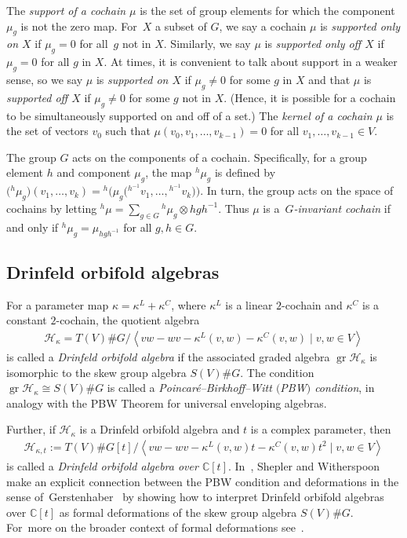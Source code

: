 \documentclass[pdftex]{sigma}
\numberwithin{equation}{section}
\newcommand{\standout}[1]{\textit{#1}} %
\newcommand{\actby}[1]{{}^{#1}}
\DeclareMathOperator{\gr}{gr}
\begin{document}
The \standout{support of a cochain $\mu$} is the set of group elements for which the component $\mu_g$ is not the zero map. For~$X$ a subset of $G$, we say a cochain $\mu$ is \standout{supported only on {\boldmath $X$}} if $\mu_g=0$ for all~$g$ not in $X$. Similarly, we say $\mu$ is
\standout{supported only off {\boldmath $X$}} if $\mu_g=0$ for all $g$ in $X$.
At times, it is convenient to talk about support in a weaker sense, so we say $\mu$ is \standout{supported on {\boldmath $X$}} if $\mu_g\neq0$ for some $g$ in $X$
and that $\mu$ is \standout{supported off {\boldmath $X$}} if $\mu_g\neq0$ for some $g$ not in $X$. (Hence, it is possible for a cochain to be simultaneously supported on and off of a set.)
The \standout{kernel of a cochain $\mu$} is the set of vectors $v_0$ such that $\mu(v_0,v_1,\ldots,v_{k-1})=0$ for all $v_1,\ldots,v_{k-1}\in V$.

The group $G$ acts on the components of a cochain. Specifically, for a group element $h$ and component $\mu_g$, the map
$\actby{h}\mu_g$ is defined by $\big(\actby{h}\mu_g\big)(v_1,\ldots,v_k)=\actby{h}\big(\mu_g\big(\actby{h^{-1}}v_1,\ldots,\actby{h^{-1}}v_k\big)\big)$. In turn, the group acts on the space of cochains by letting $\actby{h}\mu=\sum_{g\in G}\actby{h}\mu_g\otimes hgh^{-1}$. Thus $\mu$ is a~\standout{$G$-invariant cochain} if and only if $\actby{h}\mu_g=\mu_{hgh^{-1}}$ for all $g,h\in G$.

\subsection{Drinfeld orbifold algebras}%
For a parameter map $\kappa=\kappa^L+\kappa^C$, where $\kappa^L$ is a linear $2$-cochain and $\kappa^C$ is a constant $2$-cochain, the quotient algebra
\begin{gather*}
\mathcal{H}_{\kappa}=T(V)\#G/\left\langle vw-wv-\kappa^L(v,w)-\kappa^C(v,w)\mid v,w\in V\right\rangle
\end{gather*}
is called a \standout{Drinfeld orbifold algebra} if the associated graded algebra $\gr\mathcal{H}_{\kappa}$ is isomorphic to the skew group algebra
$S(V)\# G$. The condition $\gr\mathcal{H}_{\kappa}\cong S(V)\# G$ is
called a \standout{Poincar\'e--Birkhoff--Witt $($PBW$)$ condition}, in analogy with
the PBW Theorem for universal enveloping algebras.

Further, if $\mathcal{H}_{\kappa}$ is a Drinfeld orbifold algebra and $t$ is a complex parameter,
then
\begin{gather*}
\mathcal{H}_{\kappa,t}:=T(V)\#G[t]/\left\langle vw-wv-\kappa^L(v,w)t-\kappa^C(v,w)t^2\mid v,w\in V\right\rangle
\end{gather*}
is called a \standout{Drinfeld orbifold algebra over $\mathbb{C}[t]$}.
In~\cite[Theorem~2.1]{SWorbifold}, Shepler and Witherspoon make an explicit
connection between the PBW condition and deformations in the sense of~Ger\-s\-tenhaber~\cite{GerstenhaberSchack} by showing how to interpret Drinfeld orbifold
algebras over $\mathbb{C}[t]$ as formal defor\-ma\-tions of the skew group algebra
$S(V)\# G$. For~more on the broader context of formal deformations
see~\cite[Section~4]{FGK}.
\end{document}
